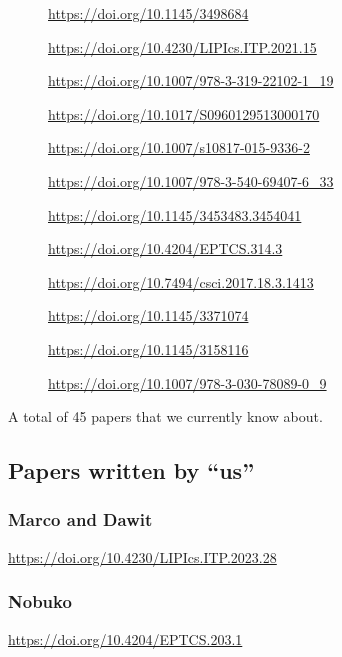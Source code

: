 \begin{description}
\item[\cite{Hirsch2022}]                  \url{https://doi.org/10.1145/3498684}
\item[\cite{Cruz-Filipe2021b}]            \url{https://doi.org/10.4230/LIPIcs.ITP.2021.15}
\item[\cite{Maksimovic2015}]              \url{https://doi.org/10.1007/978-3-319-22102-1_19}
\item[\cite{Parrow2014}]                  \url{https://doi.org/10.1017/S0960129513000170}
\item[\cite{Bengtson2016}]                \url{https://doi.org/10.1007/s10817-015-9336-2}
\item[\cite{Kahsai2008}]                  \url{https://doi.org/10.1007/978-3-540-69407-6_33}
\item[\cite{Castro-Perez2021}]            \url{https://doi.org/10.1145/3453483.3454041}
\item[\cite{Gay2020}]                     \url{https://doi.org/10.4204/EPTCS.314.3}
\item[\cite{Brady2017}]                   \url{https://doi.org/10.7494/csci.2017.18.3.1413}
\item[\cite{Hinrichsen2019}]              \url{https://doi.org/10.1145/3371074}
\item[\cite{Sergey2017}]                  \url{https://doi.org/10.1145/3158116}
\item[\cite{DBLP:conf/forte/ZalakainD21}] \url{https://doi.org/10.1007/978-3-030-78089-0_9}
\end{description}

A total of 45 papers that we currently know about.

\subsection{Papers written by ``us''}
\subsubsection{Marco and Dawit}
\cite{Tirore:2023} \url{https://doi.org/10.4230/LIPIcs.ITP.2023.28}

\subsubsection{Nobuko}
\cite{Orchard2016} \url{https://doi.org/10.4204/EPTCS.203.1}

